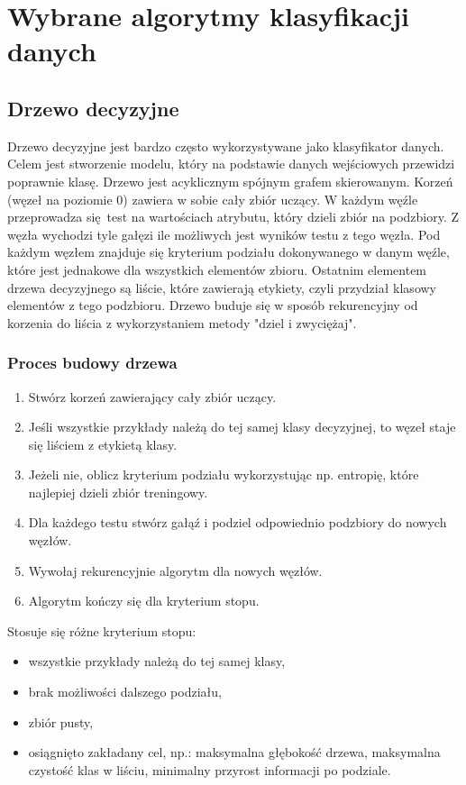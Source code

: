 \section{Wybrane algorytmy klasyfikacji danych}
\subsection{Drzewo decyzyjne}
Drzewo decyzyjne jest bardzo często wykorzystywane jako klasyfikator danych. Celem jest stworzenie modelu, który na podstawie danych wejściowych przewidzi poprawnie klasę. Drzewo jest acyklicznym spójnym grafem skierowanym. Korzeń (węzeł na poziomie 0) zawiera w sobie cały zbiór uczący. W każdym węźle przeprowadza się test na wartościach atrybutu, który dzieli zbiór na podzbiory. Z węzła wychodzi tyle gałęzi ile możliwych jest wyników testu z tego węzła. Pod każdym węzłem znajduje się kryterium podziału dokonywanego w danym węźle, które jest jednakowe dla wszystkich elementów zbioru. Ostatnim elementem drzewa decyzyjnego są liście, które zawierają etykiety, czyli przydział klasowy elementów z tego podzbioru. Drzewo buduje się w sposób rekurencyjny od korzenia do liścia z wykorzystaniem metody "dziel i zwyciężaj".\\
\subsubsection{Proces budowy drzewa}
\begin{enumerate}
	\item Stwórz korzeń zawierający cały zbiór uczący.
	\item Jeśli wszystkie przykłady należą do tej samej klasy decyzyjnej, to węzeł staje się liściem z etykietą klasy.
	\item Jeżeli nie, oblicz kryterium podziału wykorzystując np. entropię, które najlepiej dzieli zbiór treningowy.
	\item Dla każdego testu stwórz gałąź i podziel odpowiednio podzbiory do nowych węzłów.
	\item Wywołaj rekurencyjnie algorytm dla nowych węzłów.
	\item Algorytm kończy się dla kryterium stopu.
\end{enumerate}
Stosuje się różne kryterium stopu:
\begin{itemize}
	\item wszystkie przykłady należą do tej samej klasy,
	\item brak możliwości dalszego podziału,
	\item zbiór pusty,
	\item osiągnięto zakładany cel, np.: maksymalna głębokość drzewa, maksymalna czystość klas w liściu, minimalny przyrost informacji po podziale.
\end{itemize}

